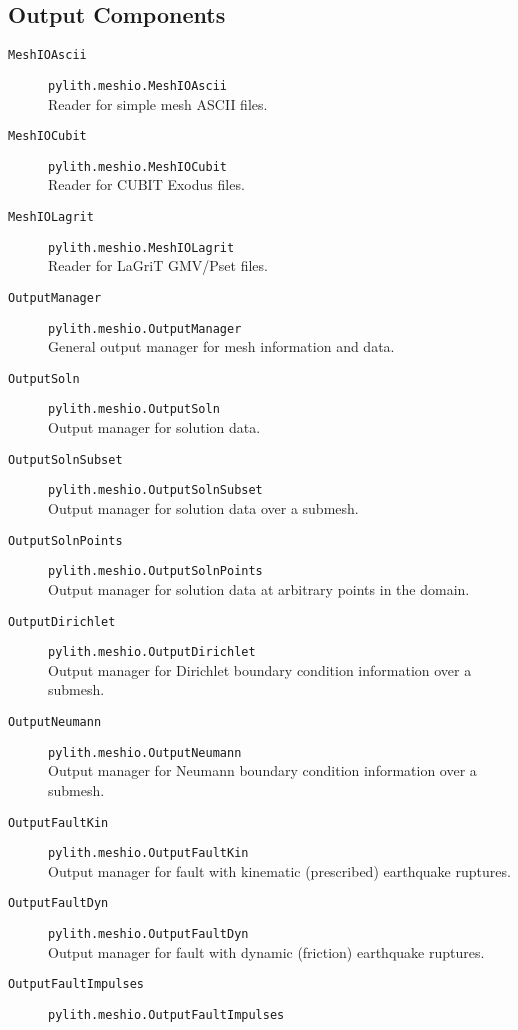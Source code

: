 \subsection{Output Components}
\begin{description}
\item [{\texttt{MeshIOAscii}}] \texttt{pylith.meshio.MeshIOAscii}\\
Reader for simple mesh ASCII files.
\item [{\texttt{MeshIOCubit}}] \texttt{pylith.meshio.MeshIOCubit}\\
Reader for CUBIT Exodus files.
\item [{\texttt{MeshIOLagrit}}] \texttt{pylith.meshio.MeshIOLagrit}\\
Reader for LaGriT GMV/Pset files.
\item [{\texttt{OutputManager}}] \texttt{pylith.meshio.OutputManager}\\
General output manager for mesh information and data.
\item [{\texttt{OutputSoln}}] \texttt{pylith.meshio.OutputSoln}\\
Output manager for solution data.
\item [{\texttt{OutputSolnSubset}}] \texttt{pylith.meshio.OutputSolnSubset}\\
Output manager for solution data over a submesh.
\item [{\texttt{OutputSolnPoints}}] \texttt{pylith.meshio.OutputSolnPoints}\\
Output manager for solution data at arbitrary points in the domain.
\item [{\texttt{OutputDirichlet}}] \texttt{pylith.meshio.OutputDirichlet}\\
Output manager for Dirichlet boundary condition information over a
submesh.
\item [{\texttt{OutputNeumann}}] \texttt{pylith.meshio.OutputNeumann}\\
Output manager for Neumann boundary condition information over a submesh.
\item [{\texttt{OutputFaultKin}}] \texttt{pylith.meshio.OutputFaultKin}\\
Output manager for fault with kinematic (prescribed) earthquake ruptures.
\item [{\texttt{OutputFaultDyn}}] \texttt{pylith.meshio.OutputFaultDyn}\\
Output manager for fault with dynamic (friction) earthquake ruptures.
\item [{\texttt{OutputFaultImpulses}}] \texttt{pylith.meshio.OutputFaultImpulses}\\

\end{description}
